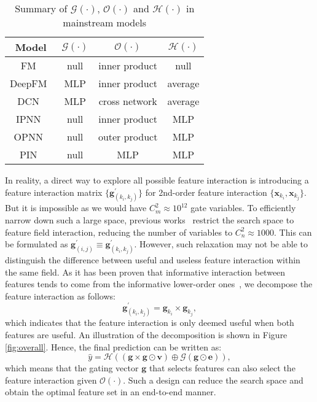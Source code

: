 \documentclass[sigconf]{acmart}
\begin{document}
\begin{table}[!htbp]
    \centering
    \caption{Summary of $\mathcal{G}(\cdot)$, $\mathcal{O}(\cdot)$ and $\mathcal{H}(\cdot)$ in mainstream models}
    \begin{tabular}{c|c|c|c}
    \hline
        Model & $\mathcal{G}(\cdot)$ & $\mathcal{O}(\cdot)$ & $\mathcal{H}(\cdot)$ \\
    \hline
        FM~\cite{FM}            & null & inner product & null \\
DeepFM~\cite{DeepFM}    & MLP & inner product & average \\ 
        DCN~\cite{DCN}          & MLP & cross network & average \\
        IPNN~\cite{IPNN}        & null & inner product & MLP \\
        OPNN~\cite{IPNN}        & null & outer product & MLP \\
        PIN~\cite{PIN}          & null & MLP & MLP \\
    \hline
    \end{tabular}
    \label{Table:summary}
\end{table}

In reality, a direct way to explore all possible feature interaction is introducing a feature interaction matrix $\{\mathbf{g}^{'}_{(k_i,k_j)}\}$ for 2nd-order feature interaction $\{\mathbf{x}_{k_i}, \mathbf{x}_{k_j}\}$. But it is impossible as we would have $C_m^2 \approx 10^{12}$ gate variables. To efficiently narrow down such a large space, previous works~\cite{AutoFIS, AutoFeature, OptInter} restrict the search space to feature field interaction, reducing the number of variables to $C_n^2 \approx 1000$. This can be formulated as $\mathbf{g}^{'}_{(i,j)} \equiv \mathbf{g}^{'}_{(k_i,k_j)}$. However, such relaxation may not be able to distinguish the difference between useful and useless feature interaction within the same field. 
As it has been proven that informative interaction between features tends to come from the informative lower-order ones~\cite{FIVES}, we decompose the feature interaction as follows:
\begin{equation}
    \mathbf{g}^{'}_{(k_i,k_j)} = \mathbf{g}_{k_i} \times \mathbf{g}_{k_j},
\end{equation}
which indicates that the feature interaction is only deemed useful when both features are useful. An illustration of the decomposition is shown in Figure \ref{fig:overall}. Hence, the final prediction can be written as:
\begin{equation}
\label{eq:final_predict}
    \hat{y} = \mathcal{H}((\mathbf{g} \times \mathbf{g} \odot \mathbf{v}) \oplus \mathcal{G}(\mathbf{g} \odot \mathbf{e})),
\end{equation}
which means that the gating vector $\mathbf{g}$ that selects features can also select the feature interaction given $\mathcal{O}(\cdot)$. Such a design can reduce the search space and obtain the optimal feature set in an end-to-end manner.
\end{document}

